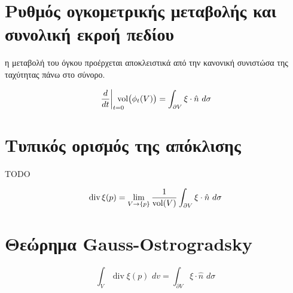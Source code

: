 \documentclass[10pt,a4paper,twoside,openany]{book}
\theoremstyle{plain}
\theoremstyle{definition}
\theoremstyle{remark}
\numberwithin{equation}{section}
\begin{document}

\section{Ρυθμός ογκομετρικής μεταβολής και συνολική εκροή πεδίου}

η μεταβολή του όγκου προέρχεται αποκλειστικά από την κανονική συνιστώσα της ταχύτητας πάνω στο σύνορο.

\begin{equation}
\left.\frac{d}{dt}\right|_{t=0}
\hspace{-10pt}
\operatorname{vol} \bigl(\phi_t(V)\bigr)
=
\int_{\partial V} \xi \cdot \hat{n} \,\, d\sigma
\end{equation}

%

\section{Τυπικός ορισμός της απόκλισης}

TODO

\begin{equation}
\operatorname{div}\xi(p)
=
\lim_{\substack{V \to \{p\}}}
\frac{1}{\operatorname{vol} (V)}
\hspace{-0pt}
\int_{\partial V} \xi \cdot \hat{n} \,\, d\sigma
\end{equation}

\section{Θεώρημα Gauss-Ostrogradsky}

\begin{equation}
\int_V \operatorname{div}\xi(p) \,\, dv
=
\int_{\partial V} \xi \cdot \hat{n} \,\, d\sigma
\end{equation}
\end{document}

